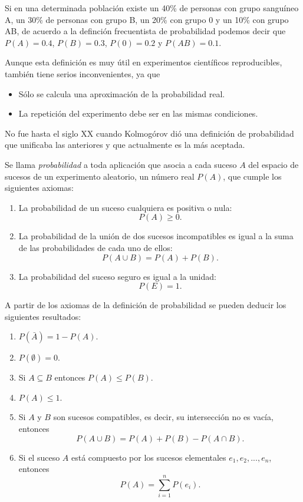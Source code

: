 \begin{ejemplo}
Si en una determinada población existe un 40\% de personas con grupo sanguíneo A, un 30\% de personas con grupo B, un 20\% con grupo 0 y un
10\% con grupo AB, de acuerdo a la definción frecuentista de probabilidad podemos decir que $P(A)=0.4$, $P(B)=0.3$, $P(0)=0.2$ y
$P(AB)=0.1$.
\end{ejemplo}

Aunque esta definición es muy útil en experimentos científicos reproducibles, también tiene serios inconvenientes, ya que
\begin{itemize}[label=--]
\item Sólo se calcula una aproximación de la probabilidad real.
\item La repetición del experimento debe ser en las mismas condiciones.  
\end{itemize}

No fue hasta el siglo XX cuando Kolmogórov dió una definición de probabilidad que unificaba las anteriores y que actualmente es la más
aceptada.

\begin{definicion}[Kolmogórov]
Se llama \emph{probabilidad} a toda aplicación que asocia a cada suceso $A$ del espacio de sucesos de un experimento aleatorio, un número
real $P(A)$, que cumple los siguientes axiomas:
\begin{enumerate}
\item La probabilidad de un suceso cualquiera es positiva o nula: \[P(A)\geq 0.\]
\item La probabilidad de la unión de dos sucesos incompatibles es igual a la suma de las probabilidades de cada uno de ellos:       
\[P(A\cup B) = P(A)+P(B).\]
\item La probabilidad del suceso seguro es igual a la unidad: 
\[P(E)=1.\]
\end{enumerate}
\end{definicion}

A partir de los axiomas de la definición de probabilidad se pueden deducir los siguientes resultados:
\begin{enumerate}
\item $P(\bar A) = 1-P(A)$.
\item $P(\emptyset)= 0$.
\item Si $A\subseteq B$ entonces $P(A)\leq P(B)$.
\item $P(A) \leq 1$.
\item Si $A$ y $B$ son sucesos compatibles, es decir, su intersección no es vacía, entonces 
\[P(A\cup B)= P(A) + P(B) - P(A\cap B).\]
\item Si el suceso $A$ está compuesto por los sucesos elementales $e_1,e_2,...,e_n$, entonces 
\[P(A)=\sum_{i=1}^n P(e_i).\]
\end{enumerate}

